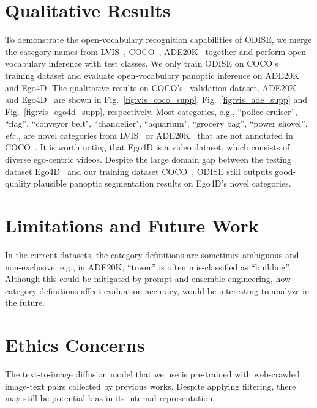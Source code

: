\documentclass[10pt,twocolumn,letterpaper]{article}
\newcommand{\ourmethod}{ODISE}
\begin{document}
\section{Qualitative Results}

To demonstrate the open-vocabulary recognition capabilities of \ourmethod{}, we merge the category names from LVIS~\cite{gupta2019lvis}, COCO~\cite{lin2014coco}, ADE20K~\cite{zhou2019ade} together and perform open-vocabulary inference with  test classes.
We only train \ourmethod{} on COCO's~\cite{lin2014coco} training dataset and evaluate open-vocabulary panoptic inference on ADE20K~\cite{zhou2019ade} and Ego4D\cite{grauman2022ego4d}.
The qualitative results on COCO's~\cite{lin2014coco} validation dataset, ADE20K~\cite{zhou2019ade} and Ego4D~\cite{grauman2022ego4d} are shown in Fig.~\ref{fig:vis_coco_supp}, Fig.~\ref{fig:vis_ade_supp} and Fig.~\ref{fig:vis_ego4d_supp}, respectively. 
Most categories, e.g., ``police cruiser'', ``flag'', ``conveyor belt", ``chandelier", ``aquarium", ``grocery bag'', ``power shovel'', \textit{etc.}, are novel categories from LVIS~\cite{gupta2019lvis} or ADE20K~\cite{zhou2019ade} that are not annotated in COCO~\cite{lin2014coco}. 
It is worth noting that Ego4D\cite{grauman2022ego4d} is a video dataset, which consists of diverse ego-centric videos. 
Despite the large domain gap between the testing dataset Ego4D~\cite{grauman2022ego4d} and our training dataset COCO~\cite{lin2014coco}, \ourmethod{} still outputs good-quality plausible panoptic segmentation results on Ego4D's novel categories.

\section{Limitations and Future Work}
In the current datasets, the category definitions are sometimes ambiguous and non-exclusive, e.g., in ADE20K, ``tower'' is often mis-classified as ``building''.
Although this could be mitigated by prompt and ensemble engineering, how category definitions affect evaluation accuracy, would be interesting to analyze in the future.

\section{Ethics Concerns}
The text-to-image diffusion model that we use is pre-trained with web-crawled image-text pairs collected by previous works. Despite applying filtering, there may still be potential bias in its internal representation.
\end{document}
